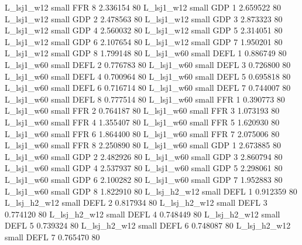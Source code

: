     L_lsj1_w12      small      FFR                 8 2.336154 80
    L_lsj1_w12      small      GDP                 1 2.659522 80
    L_lsj1_w12      small      GDP                 2 2.478563 80
    L_lsj1_w12      small      GDP                 3 2.873323 80
    L_lsj1_w12      small      GDP                 4 2.560032 80
    L_lsj1_w12      small      GDP                 5 2.314051 80
    L_lsj1_w12      small      GDP                 6 2.107654 80
    L_lsj1_w12      small      GDP                 7 1.950201 80
    L_lsj1_w12      small      GDP                 8 1.799148 80
    L_lsj1_w60      small     DEFL                 1 0.886749 80
    L_lsj1_w60      small     DEFL                 2 0.776783 80
    L_lsj1_w60      small     DEFL                 3 0.726800 80
    L_lsj1_w60      small     DEFL                 4 0.700964 80
    L_lsj1_w60      small     DEFL                 5 0.695818 80
    L_lsj1_w60      small     DEFL                 6 0.716714 80
    L_lsj1_w60      small     DEFL                 7 0.744007 80
    L_lsj1_w60      small     DEFL                 8 0.777514 80
    L_lsj1_w60      small      FFR                 1 0.390773 80
    L_lsj1_w60      small      FFR                 2 0.764187 80
    L_lsj1_w60      small      FFR                 3 1.073193 80
    L_lsj1_w60      small      FFR                 4 1.355407 80
    L_lsj1_w60      small      FFR                 5 1.620930 80
    L_lsj1_w60      small      FFR                 6 1.864400 80
    L_lsj1_w60      small      FFR                 7 2.075006 80
    L_lsj1_w60      small      FFR                 8 2.250890 80
    L_lsj1_w60      small      GDP                 1 2.673885 80
    L_lsj1_w60      small      GDP                 2 2.482926 80
    L_lsj1_w60      small      GDP                 3 2.860794 80
    L_lsj1_w60      small      GDP                 4 2.537937 80
    L_lsj1_w60      small      GDP                 5 2.298061 80
    L_lsj1_w60      small      GDP                 6 2.100282 80
    L_lsj1_w60      small      GDP                 7 1.952883 80
    L_lsj1_w60      small      GDP                 8 1.822910 80
  L_lsj_h2_w12      small     DEFL                 1 0.912359 80
  L_lsj_h2_w12      small     DEFL                 2 0.817934 80
  L_lsj_h2_w12      small     DEFL                 3 0.774120 80
  L_lsj_h2_w12      small     DEFL                 4 0.748449 80
  L_lsj_h2_w12      small     DEFL                 5 0.739324 80
  L_lsj_h2_w12      small     DEFL                 6 0.748087 80
  L_lsj_h2_w12      small     DEFL                 7 0.765470 80
